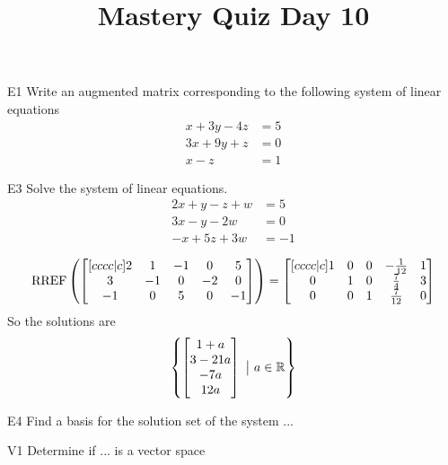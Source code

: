 \documentclass{sbgLAquiz}
\title{Mastery Quiz Day 10 }
\begin{document}
\begin{problem}{E1}
Write an augmented matrix corresponding to the following system of linear equations
\begin{align*}
x+3y-4z &= 5 \\
3x+9y+z &= 0 \\
x-z &= 1
\end{align*}
\end{problem}

\begin{problem}{E3} 
Solve the system of linear equations.
\begin{align*}
2x+y-z+w &=5 \\
3x-y-2w &= 0 \\
-x+5z+3w&=-1
\end{align*}
\end{problem}
\begin{solution}
$$\operatorname{RREF}\left( \begin{bmatrix}[cccc|c] 2 & 1 & -1 & 0 & 5 \\ 3 & -1 & 0 & -2 & 0 \\ -1 & 0 & 5 & 0 & -1 \end{bmatrix} \right) = \begin{bmatrix}[cccc|c] 1 & 0 & 0 & -\frac{1}{12} & 1 \\ 0 & 1 & 0 & \frac{7}{4} & 3 \\ 0 & 0 & 1 & \frac{7}{12} & 0 \end{bmatrix}$$
So the solutions are $$\left\{ \begin{bmatrix} 1+a \\ 3-21a \\ -7a \\ 12a \end{bmatrix}\ \big|\ a \in \mathbb{R}\right\}$$
\end{solution}

\begin{extract}\newpage\end{extract}
\begin{problem}{E4}
Find a basis for the solution set of the system ...
\end{problem}
\begin{problem}{V1}
Determine if ... is a vector space
\end{problem}
\begin{solution}

\end{solution}
\end{document}
